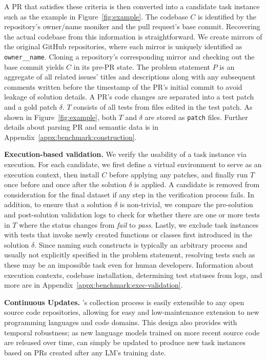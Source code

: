 A PR that satisfies these criteria is then converted into a candidate task instance such as the example in Figure~\ref{fig:example}.
The codebase $C$ is identified by the repository's owner/name moniker and the pull request's base commit.
Recovering the actual codebase from this information is straightforward.
We create mirrors of the original GitHub repositories, where each mirror is uniquely identified as \texttt{owner\_\_name}.
Cloning a repository's corresponding mirror and checking out the base commit yields $C$ in its pre-PR state.
The problem statement $P$ is an aggregate of all related issues' titles and descriptions along with any subsequent comments written before the timestamp of the PR's initial commit to avoid leakage of solution details.
A PR's code changes are separated into a test patch and a gold patch $\delta$. $T$ consists of all tests from files edited in the test patch.
As shown in Figure~\ref{fig:example}, both $T$ and $\delta$ are stored as \texttt{patch} files.
Further details about parsing PR and semantic data is in Appendix~\ref{appx:benchmark:construction}.



\textbf{Execution-based validation.} We verify the usability of a task instance via execution. 
For each candidate, we first define a virtual environment to serve as an execution context, then install $C$ before applying any patches, and finally run $T$ once before and once after the solution $\delta$ is applied.
A candidate is removed from consideration for the final dataset if any step in the verification process fails.
In addition, to ensure that a solution $\delta$ is non-trivial, we compare the pre-solution and post-solution validation logs to check for whether there are one or more tests in $T$ where the status changes from \textit{fail} to \textit{pass}.
Lastly, we exclude task instances with tests that invoke newly created functions or classes first introduced in the solution $\delta$.
Since naming such constructs is typically an arbitrary process and usually not explicitly specified in the problem statement, resolving tests such as these may be an impossible task even for human developers.
Information about execution contexts, codebase installation, determining test statuses from logs, and more are in Appendix~\ref{appx:benchmark:exec-validation}.

\textbf{Continuous Updates.} \benchmark{}'s collection process is easily extensible to any open source code repositories, allowing for easy and low-maintenance extension to new programming languages and code domains.
This design also provides \benchmark{} with temporal robustness; as new language models trained on more recent source code are released over time, \benchmark{} can simply be updated to produce new task instances based on PRs created after any LM's training date.


